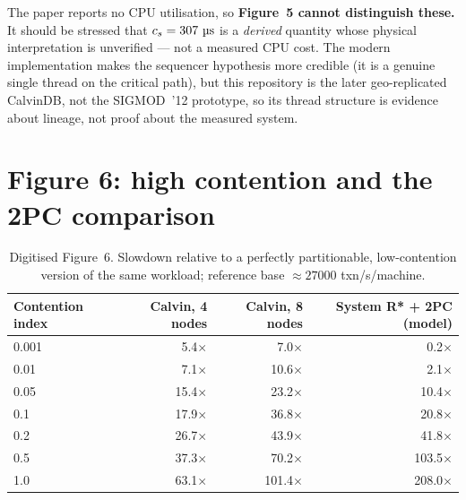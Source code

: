 \documentclass[11pt,a4paper]{article}
\newcommand{\msecs}{\ensuremath{\,\text{\textmu}\text{s}}}
\begin{document}
The paper reports no CPU utilisation, so \textbf{Figure~5 cannot distinguish
these.} It should be stressed that $c_s=\SI{307}{\msecs}$ is a
\emph{derived} quantity whose physical interpretation is unverified --- not a
measured CPU cost. The modern implementation makes the sequencer hypothesis
more credible (it is a genuine single thread on the critical path), but this
repository is the later geo-replicated CalvinDB, not the SIGMOD~'12
prototype, so its thread structure is evidence about lineage, not proof about
the measured system.

\section{Figure 6: high contention and the 2PC comparison}
\label{sec:fig6}

\begin{table}[H]
\centering
\caption{Digitised Figure~6. Slowdown relative to a perfectly partitionable,
low-contention version of the same workload; reference base
$\approx\num{27000}$ txn/s/machine.}
\label{tab:fig6}
\begin{tabular}{@{}lrrr@{}}
\toprule
\textbf{Contention index} & \textbf{Calvin, 4 nodes} & \textbf{Calvin, 8 nodes} &
\textbf{System R* + 2PC (model)} \\
\midrule
\num{0.001} &  \num{5.4}$\times$ &  \num{7.0}$\times$  &  \num{0.2}$\times$ \\
\num{0.01}  &  \num{7.1}$\times$ & \num{10.6}$\times$  &  \num{2.1}$\times$ \\
\num{0.05}  & \num{15.4}$\times$ & \num{23.2}$\times$  & \num{10.4}$\times$ \\
\num{0.1}   & \num{17.9}$\times$ & \num{36.8}$\times$  & \num{20.8}$\times$ \\
\num{0.2}   & \num{26.7}$\times$ & \num{43.9}$\times$  & \num{41.8}$\times$ \\
\num{0.5}   & \num{37.3}$\times$ & \num{70.2}$\times$  & \num{103.5}$\times$ \\
\num{1.0}   & \num{63.1}$\times$ & \num{101.4}$\times$ & \num{208.0}$\times$ \\
\bottomrule
\end{tabular}
\end{table}
\end{document}
